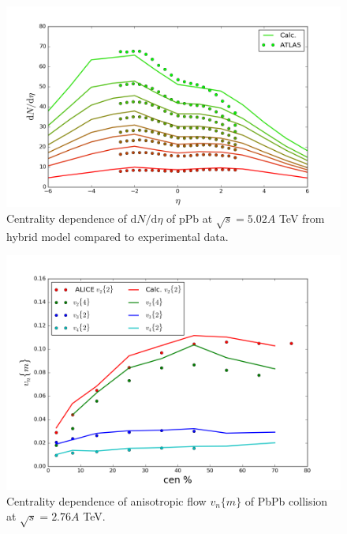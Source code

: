 \documentclass[aps,prl,twocolumn,groupedaddress]{revtex4-1}
\begin{document}
	\begin{figure}
  	\centering
	\includegraphics[width=\columnwidth]{pics/RUN-1-pPb-dNdy-eta.png}
	\caption{Centrality dependence of $\mathrm{d}N/\mathrm{d}\eta$ of pPb at $\sqrt{s} = 5.02 A$ TeV from hybrid model compared to experimental data.}
  	\label{pPb-dNdy-calc}
	\end{figure}
	
	\begin{figure}
  	\centering
	\includegraphics[width=\columnwidth]{pics/new-PbPb-vnm-p1.png}	
	\caption{Centrality dependence of anisotropic flow $v_n\{m\}$ of PbPb collision at $\sqrt{s} = 2.76 A$ TeV.}
  	\label{PbPb-vn-calc}
	\end{figure}
	
\end{document}
